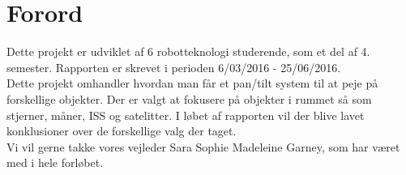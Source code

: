 \section*{Forord}

Dette projekt er udviklet af 6 robotteknologi studerende, som et del af 4. semester. Rapporten er skrevet i perioden 6/03/2016 - 25/06/2016. 
\\
Dette projekt omhandler hvordan man får et pan/tilt system til at peje på forskellige objekter. Der er valgt at fokusere på objekter i rummet så som stjerner, måner, ISS og satelitter. I løbet af rapporten vil der blive lavet konklusioner over de forskellige valg der taget.
\\
Vi vil gerne takke vores vejleder Sara Sophie Madeleine Garney, som har været med i hele forløbet.
